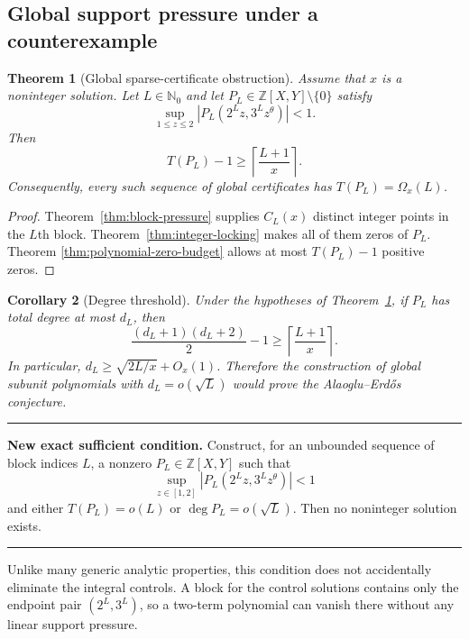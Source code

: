 \documentclass[11pt,oneside]{article}
\newtheorem{theorem}{Theorem}[section]
\newtheorem{corollary}[theorem]{Corollary}
\theoremstyle{definition}
\theoremstyle{remark}
\newcommand{\Nzero}{\mathbb N_0}
\newcommand{\Z}{\mathbb Z}
\newcommand{\AEconj}{Alaoglu--Erd\H{o}s}
\newcommand{\tht}{\theta}
\newcommand{\ceil}[1]{\left\lceil#1\right\rceil}
\newenvironment{resultbox}
{\begin{center}\begin{minipage}{0.95\textwidth}\hrule\vspace{0.5em}}
{\vspace{0.45em}\hrule\end{minipage}\end{center}}
\begin{document}
\subsection{Global support pressure under a counterexample}

\begin{theorem}[Global sparse-certificate obstruction]
\label{thm:global-support-pressure}
Assume that $x$ is a noninteger solution.  Let $L\in\Nzero$ and let
$P_L\in\Z[X,Y]\setminus\{0\}$ satisfy
\begin{equation}
  \sup_{1\le z\le2}|P_L(2^Lz,3^Lz^\tht)|<1.
  \label{eq:global-certificate}
\end{equation}
Then
\begin{equation}
  T(P_L)-1\ge \ceil{\frac{L+1}{x}}.
  \label{eq:support-lower}
\end{equation}
Consequently, every such sequence of global certificates has $T(P_L)=\Omega_x(L)$.
\end{theorem}

\begin{proof}
Theorem~\ref{thm:block-pressure} supplies $C_L(x)$ distinct integer points in the $L$th block.
Theorem~\ref{thm:integer-locking} makes all of them zeros of $P_L$.  Theorem
\ref{thm:polynomial-zero-budget} allows at most $T(P_L)-1$ positive zeros.
\end{proof}

\begin{corollary}[Degree threshold]
\label{cor:degree-threshold}
Under the hypotheses of Theorem~\ref{thm:global-support-pressure}, if $P_L$ has total degree at most
$d_L$, then
\begin{equation}
  \frac{(d_L+1)(d_L+2)}2-1
  \ge \ceil{\frac{L+1}{x}}.
  \label{eq:degree-lower}
\end{equation}
In particular, $d_L\ge\sqrt{2L/x}+O_x(1)$.  Therefore the construction of global subunit
polynomials with $d_L=o(\sqrt L)$ would prove the \AEconj{} conjecture.
\end{corollary}

\begin{resultbox}
\textbf{New exact sufficient condition.}
Construct, for an unbounded sequence of block indices $L$, a nonzero $P_L\in\Z[X,Y]$ such that
\[
  \sup_{z\in[1,2]}|P_L(2^Lz,3^Lz^\tht)|<1
\]
and either $T(P_L)=o(L)$ or $\deg P_L=o(\sqrt L)$.  Then no noninteger solution exists.
\end{resultbox}

Unlike many generic analytic properties, this condition does not accidentally eliminate the
integral controls.  A block for the control solutions contains only the endpoint pair
$(2^L,3^L)$, so a two-term polynomial can vanish there without any linear support pressure.
\end{document}
